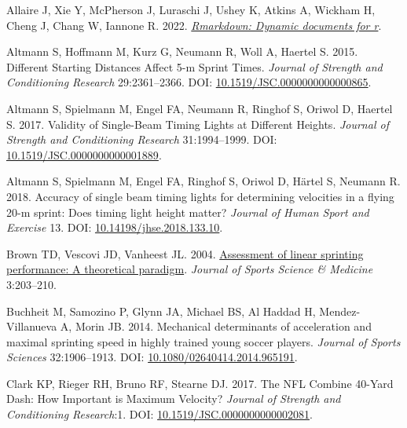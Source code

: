 \documentclass[fleqn,10pt]{wlpeerj} %
\newlength{\cslhangindent}
\newlength{\cslentryspacingunit} %
\newenvironment{CSLReferences}[2] %
 {%
  \setlength{\parindent}{0pt}
  \ifodd #1
  \let\oldpar\par
  \def\par{\hangindent=\cslhangindent\oldpar}
  \fi
  \setlength{\parskip}{#2\cslentryspacingunit}
 }%
 {}
\begin{document}
\hypertarget{refs}{}
\begin{CSLReferences}{1}{0}
\leavevmode{}%
Allaire J, Xie Y, McPherson J, Luraschi J, Ushey K, Atkins A, Wickham H, Cheng J, Chang W, Iannone R. 2022. \emph{\href{https://CRAN.R-project.org/package=rmarkdown}{Rmarkdown: Dynamic documents for r}}.

\leavevmode{}%
Altmann S, Hoffmann M, Kurz G, Neumann R, Woll A, Haertel S. 2015. Different {Starting Distances Affect} 5-m {Sprint Times}. \emph{Journal of Strength and Conditioning Research} 29:2361--2366. DOI: \href{https://doi.org/10.1519/JSC.0000000000000865}{10.1519/JSC.0000000000000865}.

\leavevmode{}%
Altmann S, Spielmann M, Engel FA, Neumann R, Ringhof S, Oriwol D, Haertel S. 2017. Validity of {Single}-{Beam Timing Lights} at {Different Heights}. \emph{Journal of Strength and Conditioning Research} 31:1994--1999. DOI: \href{https://doi.org/10.1519/JSC.0000000000001889}{10.1519/JSC.0000000000001889}.

\leavevmode{}%
Altmann S, Spielmann M, Engel FA, Ringhof S, Oriwol D, Härtel S, Neumann R. 2018. Accuracy of single beam timing lights for determining velocities in a flying 20-m sprint: {Does} timing light height matter? \emph{Journal of Human Sport and Exercise} 13. DOI: \href{https://doi.org/10.14198/jhse.2018.133.10}{10.14198/jhse.2018.133.10}.

\leavevmode{}%
Brown TD, Vescovi JD, Vanheest JL. 2004. \href{https://www.ncbi.nlm.nih.gov/pmc/articles/PMC3938058}{Assessment of linear sprinting performance: A theoretical paradigm}. \emph{Journal of Sports Science \& Medicine} 3:203--210.

\leavevmode{}%
Buchheit M, Samozino P, Glynn JA, Michael BS, Al Haddad H, Mendez-Villanueva A, Morin JB. 2014. Mechanical determinants of acceleration and maximal sprinting speed in highly trained young soccer players. \emph{Journal of Sports Sciences} 32:1906--1913. DOI: \href{https://doi.org/10.1080/02640414.2014.965191}{10.1080/02640414.2014.965191}.

\leavevmode{}%
Clark KP, Rieger RH, Bruno RF, Stearne DJ. 2017. The {NFL Combine} 40-{Yard Dash}: {How Important} is {Maximum Velocity}? \emph{Journal of Strength and Conditioning Research}:1. DOI: \href{https://doi.org/10.1519/JSC.0000000000002081}{10.1519/JSC.0000000000002081}.


\end{CSLReferences}
\end{document}
